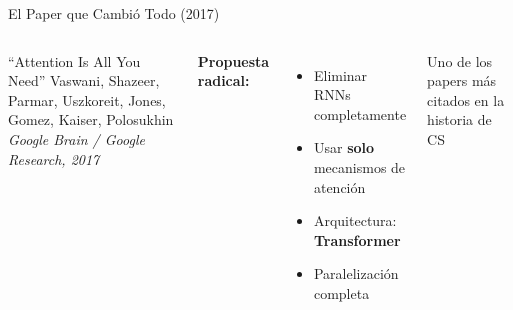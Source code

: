 \documentclass[aspectratio=169]{beamer}
\begin{document}
\begin{frame}{El Paper que Cambió Todo (2017)}
    \begin{columns}
        \begin{block}{``Attention Is All You Need''}
            Vaswani, Shazeer, Parmar, Uszkoreit, Jones, Gomez, Kaiser, Polosukhin\\
            \textit{Google Brain / Google Research, 2017}
        \end{block}
        
        \vspace{0.3cm}
        \textbf{Propuesta radical:}
        \begin{itemize}
            \item Eliminar RNNs completamente
            \item Usar \textbf{solo} mecanismos de atención
            \item Arquitectura: \textbf{Transformer}
            \item Paralelización completa
        \end{itemize}
        
        \centering
        
        \vspace{0.2cm}
        \scriptsize Uno de los papers más citados en la historia de CS
    \end{columns}
\end{frame}
\end{document}

